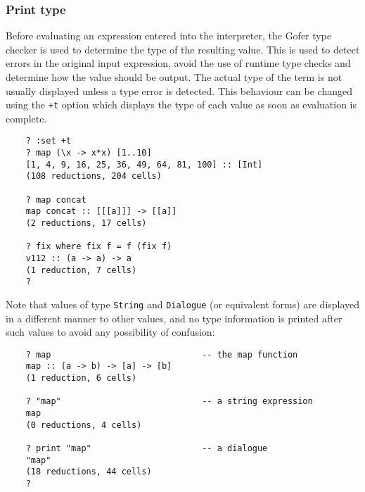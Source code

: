 \subsubsection{Print type}
Before evaluating an expression entered into the interpreter, the Gofer
type checker is used to determine the type of the resulting value.
This is used to detect errors in the original input expression, avoid
the use of runtime type checks and determine how the value should be
output.  The actual type of the term is not usually displayed unless a
type error is detected.  This behaviour can be changed using the \verb"+t"
option which displays the type of each value as soon as evaluation is
complete.
\begin{verbatim}
    ? :set +t
    ? map (\x -> x*x) [1..10]
    [1, 4, 9, 16, 25, 36, 49, 64, 81, 100] :: [Int]
    (108 reductions, 204 cells)

    ? map concat
    map concat :: [[[a]]] -> [[a]]
    (2 reductions, 17 cells)

    ? fix where fix f = f (fix f)
    v112 :: (a -> a) -> a
    (1 reduction, 7 cells)
    ?
\end{verbatim}
Note that values of type \verb"String" and \verb"Dialogue" 
(or equivalent forms) are
displayed in a different manner to other values, and no type information
is printed after such values to avoid any possibility of confusion:
\begin{verbatim}
    ? map                              -- the map function
    map :: (a -> b) -> [a] -> [b]
    (1 reduction, 6 cells)

    ? "map"                            -- a string expression
    map
    (0 reductions, 4 cells)

    ? print "map"                      -- a dialogue
    "map"
    (18 reductions, 44 cells)
    ?
\end{verbatim}

